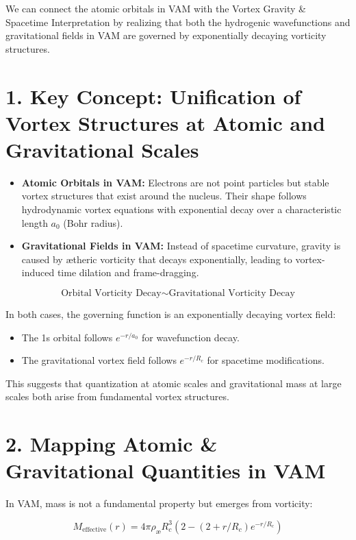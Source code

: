 We can connect the atomic orbitals in VAM with the Vortex Gravity \& Spacetime Interpretation by realizing that both the hydrogenic wavefunctions and gravitational fields in VAM are governed by exponentially decaying vorticity structures.

\section*{1. Key Concept: Unification of Vortex Structures at Atomic and Gravitational Scales}

\begin{itemize}
    \item \textbf{Atomic Orbitals in VAM:} Electrons are not point particles but stable vortex structures that exist around the nucleus. Their shape follows hydrodynamic vortex equations with exponential decay over a characteristic length \(a_0\) (Bohr radius).
    \item \textbf{Gravitational Fields in VAM:} Instead of spacetime curvature, gravity is caused by ætheric vorticity that decays exponentially, leading to vortex-induced time dilation and frame-dragging.
\end{itemize}

\[
\text{Orbital Vorticity Decay} \sim \text{Gravitational Vorticity Decay}
\]

In both cases, the governing function is an exponentially decaying vortex field:

\begin{itemize}
    \item The 1s orbital follows \(e^{-r/a_0}\) for wavefunction decay.
    \item The gravitational vortex field follows \(e^{-r/R_c}\) for spacetime modifications.
\end{itemize}

This suggests that quantization at atomic scales and gravitational mass at large scales both arise from fundamental vortex structures.

\section*{2. Mapping Atomic \& Gravitational Quantities in VAM}

In VAM, mass is not a fundamental property but emerges from vorticity:

\[
M_\text{effective}(r) = 4\pi \rho_\text{\ae} R_c^3 \left( 2 - (2 + r/R_c) e^{-r / R_c} \right)
\]

